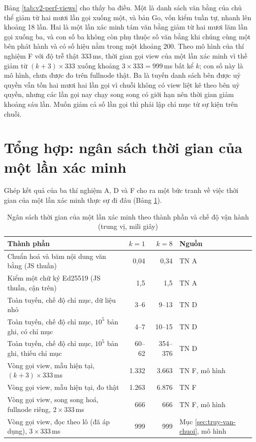 

Bảng \ref{tab:v2-perf-views} cho thấy ba điều. Một là danh sách văn bằng của chủ thể giảm từ hai mươi lần gọi xuống một, và bản Go, vốn kiểm tuần tự, nhanh lên khoảng 18 lần. Hai là một lần xác minh tám văn bằng giảm từ hai mươi lăm lần gọi xuống ba, và con số ba không còn phụ thuộc số văn bằng khi chúng cùng một bên phát hành và có số hiệu nằm trong một khoảng 200. Theo mô hình của thí nghiệm F với độ trễ thật 333\,ms, thời gian gọi view của một lần xác minh vì thế giảm từ $(k+3) \times 333$ xuống khoảng $3 \times 333 = 999$\,ms bất kể $k$; con số này là mô hình, chưa được đo trên fullnode thật. Ba là tuyến danh sách bên được uỷ quyền vẫn tốn hai mươi hai lần gọi vì chuỗi không có view liệt kê theo bên uỷ quyền, nhưng các lần gọi nay chạy song song có giới hạn nên thời gian giảm khoảng sáu lần. Muốn giảm cả số lần gọi thì phải lập chỉ mục từ sự kiện trên chuỗi.

\section{Tổng hợp: ngân sách thời gian của một lần xác minh}
\label{sec:ngan-sach}

Ghép kết quả của ba thí nghiệm A, D và F cho ra một bức tranh về việc thời gian của một lần xác minh thực sự đi đâu (Bảng \ref{tab:v2-budget}).

\begin{table}[H]
\centering
\caption{Ngân sách thời gian của một lần xác minh theo thành phần và chế độ vận hành (trung vị, mili giây)}
\label{tab:v2-budget}
\renewcommand{\arraystretch}{1.2}
\small
\begin{tabular}{|p{7.4cm}|r|r|p{1.6cm}|}
\hline
\textbf{Thành phần} & \textbf{$k=1$} & \textbf{$k=8$} & \textbf{Nguồn} \\ \hline
Chuẩn hoá và băm nội dung văn bằng (JS thuần) & 0,04 & 0,34 & TN A \\ \hline
Kiểm một chữ ký Ed25519 (JS thuần, cận trên) & 1,5 & 1,5 & TN A \\ \hline
Toàn tuyến, chế độ chỉ mục, dữ liệu nhỏ & 3--6 & 9--13 & TN D \\ \hline
Toàn tuyến, chế độ chỉ mục, $10^5$ bản ghi, có chỉ mục & 4--7 & 10--15 & TN D \\ \hline
Toàn tuyến, chế độ chỉ mục, $10^5$ bản ghi, thiếu chỉ mục & 60--62 & 354--376 & TN D \\ \hline
Vòng gọi view, mẫu hiện tại, $(k+3) \times 333$\,ms & 1.332 & 3.663 & TN F, mô hình \\ \hline
Vòng gọi view, mẫu hiện tại, đo thật & 1.263 & 6.876 & TN F \\ \hline
Vòng gọi view, song song hoá, fullnode riêng, $2 \times 333$\,ms & 666 & 666 & TN F, mô hình \\ \hline
Vòng gọi view, đọc theo lô (đã áp dụng), $3 \times 333$\,ms & 999 & 999 & Mục \ref{sec:truy-van-chuoi}, mô hình \\ \hline
\end{tabular}
\end{table}

